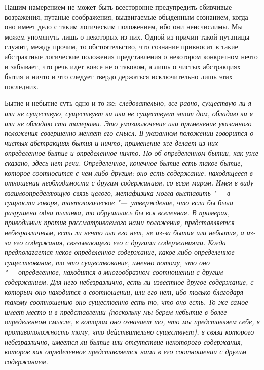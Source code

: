 Нашим намерением не может быть всесторонне предупредить сбивчивые
возражения, путаные соображения, выдвигаемые обыденным сознанием, когда оно
имеет дело с таким логическим положением, ибо они неисчислимы. Мы можем
упомянуть лишь о некоторых из них. Одной из причин такой путаницы служит,
между прочим, то обстоятельство, что сознание привносит в такие абстрактные
логические положения представления о некотором конкретном нечто и забывает,
что речь идет вовсе не о таковом, а лишь о чистых абстракциях бытия и ничто
и что следует твердо держаться исключительно лишь этих последних.

Бытие и небытие суть одно и то же; \em{следовательно},
все равно, существую ли я или не существую, существует ли или не существует
этот дом, обладаю ли я или не обладаю ста талерами. Это умозаключение или
применение указанного положения совершенно меняет его смысл. В указанном
положении говорится о чистых абстракциях бытия и ничто; применение же
делает из них определенное бытие и определенное ничто. Но об определенном
бытии, как уже сказано, здесь нет речи. Определенное, конечное бытие есть
такое бытие, которое соотносится с чем-либо другим; оно есть содержание,
находящееся в отношении необходимости с другим содержанием, со всем миром.
Имея в виду взаимоопределяющую связь целого, метафизика могла выставить "---~в
сущности говоря, тавтологическое "---~утверждение, что если бы была разрушена
одна пылинка, то обрушилась бы вся вселенная. В примерах, приводимых против
рассматриваемого нами положения, представляется небезразличным, есть ли
нечто или его нет, не из-за бытия или небытия, а из-за его
\em{содержания}, связывающего его с другими
содержаниями. Когда \em{предполагается} некое
определенное содержание, какое-либо определенное существование, то это
существование, именно потому, что оно
"---~\em{определенное}, находится в многообразном
соотношении с другим содержанием. Для него небезразлично, есть ли известное
другое содержание, с которым оно находится в соотношении, или его нет, ибо
только благодаря такому соотношению оно существенно есть то, что оно есть.
То же самое имеет место и в \em{представлении}
(поскольку мы берем небытие в более определенном смысле, в котором оно
означает то, что мы представляем себе, в противоположность тому, что
действительно существует), в связи которого небезразлично, имеется ли бытие
или отсутствие некоторого содержания, которое как определенное
представляется нами в его соотношении с другим содержанием.

